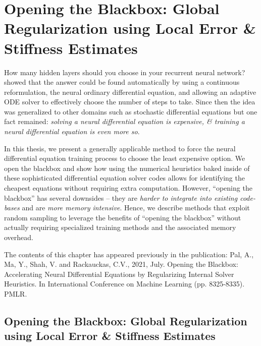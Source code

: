 \chapter{Opening the Blackbox: Global Regularization using Local Error \& Stiffness Estimates}
\label{chapter:internal_solver_heuristics_regularized_neural_des}

How many hidden layers should you choose in your recurrent neural network? \citet{chen2018neural} showed that the answer could be found automatically by using a continuous reformulation, the neural ordinary differential equation, and allowing an adaptive ODE solver to effectively choose the number of steps to take. Since then the idea was generalized to other domains such as stochastic differential equations \citep{liu2019neural, rackauckas2020universal} but one fact remained: \textit{solving a neural differential equation is expensive, \& training a neural differential equation is even more so}.

In this thesis, we present a generally applicable method to force the neural differential equation training process to choose the least expensive option. We open the blackbox and show how using the numerical heuristics baked inside of these sophisticated differential equation solver codes allows for identifying the cheapest equations without requiring extra computation. However, ``opening the blackbox'' has several downsides -- they are \textit{harder to integrate into existing code-bases} and are \textit{more memory intensive}. Hence, we describe methods that exploit random sampling to leverage the benefits of ``opening the blackbox'' without actually requiring specialized training methods and the associated memory overhead.

The contents of this chapter has appeared previously in the publication: Pal, A., Ma, Y., Shah, V. and Rackauckas, C.V., 2021, July. Opening the Blackbox: Accelerating Neural Differential Equations by Regularizing Internal Solver Heuristics. In International Conference on Machine Learning (pp. 8325-8335). PMLR. \citep{pal2021opening}


\section{Opening the Blackbox: Global Regularization using Local Error \& Stiffness Estimates}
\label{sec:global_regularization_using_local_error_and_stiffness_estimates}

